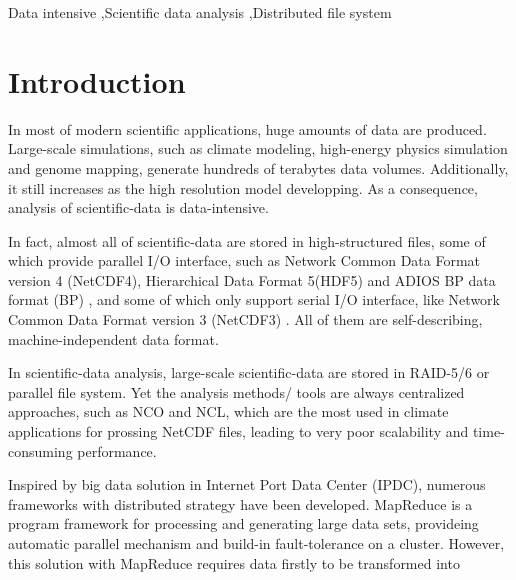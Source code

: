 \documentclass[preprint,12pt]{elsarticle}
\begin{document}
\begin{frontmatter}
\begin{keyword}


Data intensive \sep Scientific data analysis \sep Distributed file system
\end{keyword}

\end{frontmatter}

\linenumbers

\section{Introduction}
In most of modern scientific applications, huge amounts of data are produced. Large-scale simulations, such as climate modeling,
high-energy physics simulation and genome mapping, generate hundreds of terabytes data volumes\cite{kosar2009new}\cite{hey2003data}. 
Additionally, it still increases as the high resolution model developping. As a consequence, analysis of scientific-data is 
data-intensive.\par
In fact, almost all of scientific-data are stored in high-structured files, some of which provide parallel I/O interface, such as
Network Common Data Format version 4 (NetCDF4)\cite{rew2006netcdf}, Hierarchical Data Format 5(HDF5)\cite{folk1999hdf5} and ADIOS BP data
format (BP) \cite{lofstead2008input}, and some of which only support serial I/O interface,  like Network Common Data Format version 3
(NetCDF3) \cite{rew1990netcdf}. All of them are self-describing, machine-independent data format. \par
In scientific-data analysis, large-scale scientific-data are stored in RAID-5/6 or parallel file system. Yet the analysis methods/
tools are always centralized approaches, such as NCO\cite{zender2008analysis} and NCL\cite{ncl}, which are the most used in climate 
applications for prossing NetCDF files, leading to very poor scalability and time-consuming performance. \par    
Inspired by big data solution in Internet Port Data Center (IPDC), numerous frameworks with distributed strategy have been developed.
MapReduce is a program framework for processing and generating large data sets, provideing automatic parallel mechanism and build-in 
fault-tolerance on a cluster\cite{dean2008mapreduce}. However, this solution with MapReduce requires data firstly to be transformed into 
\end{document}
